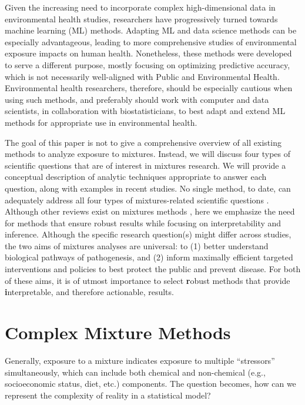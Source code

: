 Given the increasing need to incorporate complex high-dimensional data in environmental health studies, researchers have progressively turned towards machine learning (ML) methods. Adapting ML and data science methods can be especially advantageous, leading to more comprehensive studies of environmental exposure impacts on human health. Nonetheless, these methods were developed to serve a different purpose, mostly focusing on optimizing predictive accuracy, which is not necessarily well-aligned with Public and Environmental Health. Environmental health researchers, therefore, should be especially cautious when using such methods, and preferably should work with computer and data scientists, in collaboration with biostatisticians, to best adapt and extend ML methods for appropriate use in environmental health. 

The goal of this paper is not to give a comprehensive overview of all existing methods to analyze exposure to mixtures. Instead, we will discuss four types of scientific questions that are of interest in mixtures research. We will provide a conceptual description of analytic techniques appropriate to answer each question, along with examples in recent studies. No single method, to date, can adequately address all four types of mixtures-related scientific questions \citep{taylor16, niehs_workshop15}. Although other reviews exist on mixtures methods \citep{hamra2018environmental, stafoggia2017statistical, huang2018cumulative, coker2018multi}, here we emphasize the need for methods that ensure robust results while focusing on interpretability and inference. Although the specific research question(s) might differ across studies, the two aims of mixtures analyses are universal: to (1) better understand biological pathways of pathogenesis, and (2) inform maximally efficient targeted interventions and policies to best protect the public and prevent disease. For both of these aims, it is of utmost importance to select {\textbf robust} methods that provide {\textbf interpretable}, and therefore actionable, results.

\section{Complex Mixture Methods}\label{sec:Methods}

Generally, exposure to a mixture indicates exposure to multiple ``stressors'' simultaneously, which can include both chemical and non-chemical (e.g., socioeconomic status, diet, etc.) components. The question becomes, how can we represent the complexity of reality in a statistical model? 

